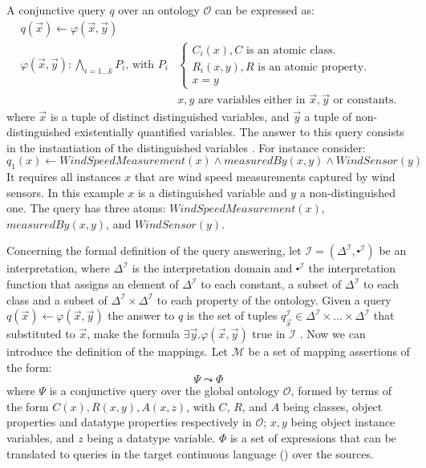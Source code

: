 A conjunctive query $q$ over an ontology $\mathcal{O}$ can be expressed as:
\begin{align*}
q(\vec{x}) \leftarrow \varphi(\vec{x},\vec{y}) \\
%
\varphi(\vec{x},\vec{y}):\underset{i=1...k}{\bigwedge}P_i \mbox{, with } P_i &\begin{cases} C_i(x),   C \mbox{ is an atomic class. } \\
  R_i(x,y),   R \mbox{ is an atomic property.}\\ x=y
\end{cases}
\\&x,y \mbox{ are variables either in $\vec{x}, \vec{y}$ or constants.}
\end{align*}
%
where $\vec{x}$ is a tuple of distinct distinguished variables, and $\vec{y}$ a tuple of non-distinguished existentially quantified variables. 
The answer to this query consists in the instantiation of the distinguished variables
\cite{Calvanese_05}. 
For instance consider:
\begin{equation*}
q_1(x) \leftarrow WindSpeedMeasurement(x)\wedge measuredBy(x,y)\wedge WindSensor(y)
\end{equation*}
It requires all instances $x$ that are wind speed measurements captured by wind sensors.
In this example $x$ is a distinguished variable and $y$ a non-distinguished one. 
The query has three atoms: $WindSpeedMeasurement(x)$, $measuredBy(x,y)$, and $WindSensor(y)$.

Concerning the formal definition of the query answering, let $\mathcal{I}=(\Delta^\mathcal{I} ,\centerdot^\mathcal{I})$ be an interpretation, where $\Delta^\mathcal{I}$ is the interpretation domain and $\centerdot^\mathcal{I}$ the interpretation function that assigns an element of $\Delta^\mathcal{I}$ to each constant, a subset of $\Delta^\mathcal{I}$ to each class and a subset of $\Delta^\mathcal{I} \times \Delta^\mathcal{I}$ to each property of the ontology.
Given a query $q(\vec{x})\leftarrow \varphi(\vec{x},\vec{y})$ the answer to $q$ is the set of tuples $q^{\mathcal{I}}_{\vec{x}} \in \Delta^\mathcal{I} \times \dots \times \Delta^\mathcal{I}$ that substituted to $\vec{x}$, make the formula $\exists\vec{y}.\varphi(\vec{x},\vec{y})$ true in $\mathcal{I}$ \cite{Poggi_08,Lubyte_09}.
Now we can introduce the definition of the mappings. 
Let $\mathcal{M}$ be a set of mapping assertions of the form:
\begin{equation*}
\Psi \leadsto \Phi
\end{equation*}
where $\Psi$ is a conjunctive query over the global ontology $\mathcal{O}$, formed by terms of the form $C(x), R(x,y), A(x,z)$, with $C$, $R$, and $A$ being classes, object properties and datatype properties respectively in $\mathcal{O}$; $x, y$ being object instance variables, and $z$ being a datatype variable. 
$\Phi$ is a set of expressions that can be translated to queries in the target continuous language (\eg \sneeql) over the sources.

